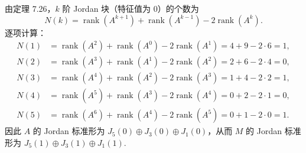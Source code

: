\documentclass[../../main.tex]{subfiles}%
\begin{document}
\begin{solution}
由定理 7.26，$k$ 阶 Jordan 块（特征值为 $0$）的个数为
\[
N(k)=\operatorname{rank}(A^{k+1})+\operatorname{rank}(A^{k-1})-2\operatorname{rank}(A^k).
\]
逐项计算：
\[
\begin{aligned}
N(1)&=\operatorname{rank}(A^2)+\operatorname{rank}(A^0)-2\operatorname{rank}(A^1)=4+9-2\cdot 6=1,\\
N(2)&=\operatorname{rank}(A^3)+\operatorname{rank}(A^1)-2\operatorname{rank}(A^2)=2+6-2\cdot 4=0,\\
N(3)&=\operatorname{rank}(A^4)+\operatorname{rank}(A^2)-2\operatorname{rank}(A^3)=1+4-2\cdot 2=1,\\
N(4)&=\operatorname{rank}(A^5)+\operatorname{rank}(A^3)-2\operatorname{rank}(A^4)=0+2-2\cdot 1=0,\\
N(5)&=\operatorname{rank}(A^6)+\operatorname{rank}(A^4)-2\operatorname{rank}(A^5)=0+1-2\cdot 0=1.
\end{aligned}
\]
因此 $A$ 的 Jordan 标准形为 $J_5(0)\oplus J_3(0)\oplus J_1(0)$，从而 $M$ 的 Jordan 标准形为 $J_5(1)\oplus J_3(1)\oplus J_1(1)$.
\end{solution}
\end{document}
